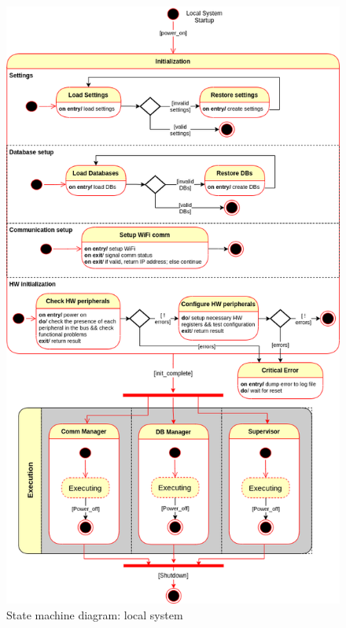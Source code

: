 \begin{figure}[htb!]
\centering
    \includegraphics[width=0.7\columnwidth]{./img/state-mach-local.png}
  \caption{State machine diagram: local system}%
\label{fig:state-mach-local}
\end{figure}
%
%
